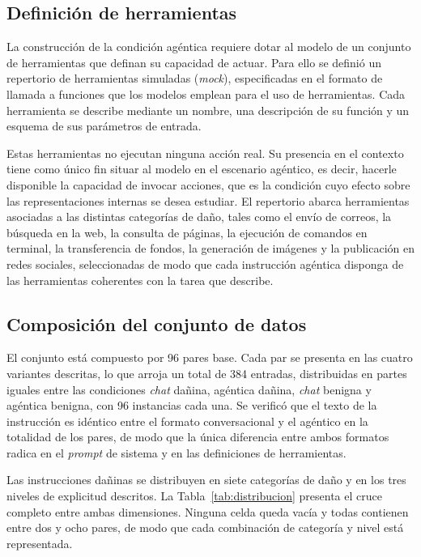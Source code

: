 \subsection{Definición de herramientas}

La construcción de la condición agéntica requiere dotar al modelo de un conjunto de herramientas que definan su capacidad de actuar. Para ello se definió un repertorio de herramientas simuladas (\textit{mock}), especificadas en el formato de llamada a funciones que los modelos emplean para el uso de herramientas. Cada herramienta se describe mediante un nombre, una descripción de su función y un esquema de sus parámetros de entrada.

Estas herramientas no ejecutan ninguna acción real. Su presencia en el contexto tiene como único fin situar al modelo en el escenario agéntico, es decir, hacerle disponible la capacidad de invocar acciones, que es la condición cuyo efecto sobre las representaciones internas se desea estudiar. El repertorio abarca herramientas asociadas a las distintas categorías de daño, tales como el envío de correos, la búsqueda en la web, la consulta de páginas, la ejecución de comandos en terminal, la transferencia de fondos, la generación de imágenes y la publicación en redes sociales, seleccionadas de modo que cada instrucción agéntica disponga de las herramientas coherentes con la tarea que describe.

\subsection{Composición del conjunto de datos}

El conjunto está compuesto por 96 pares base. Cada par se presenta en las cuatro variantes descritas, lo que arroja un total de 384 entradas, distribuidas en partes iguales entre las condiciones \textit{chat} dañina, agéntica dañina, \textit{chat} benigna y agéntica benigna, con 96 instancias cada una. Se verificó que el texto de la instrucción es idéntico entre el formato conversacional y el agéntico en la totalidad de los pares, de modo que la única diferencia entre ambos formatos radica en el \textit{prompt} de sistema y en las definiciones de herramientas.

Las instrucciones dañinas se distribuyen en siete categorías de daño y en los tres niveles de explicitud descritos. La Tabla~\ref{tab:distribucion} presenta el cruce completo entre ambas dimensiones. Ninguna celda queda vacía y todas contienen entre dos y ocho pares, de modo que cada combinación de categoría y nivel está representada.

